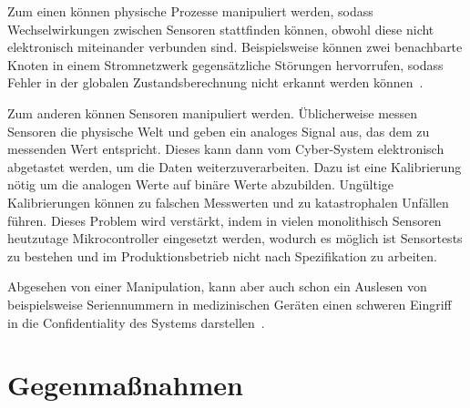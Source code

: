 \documentclass[final,bibliography=totocnumbered]{include/sikseminar}
\newcommand{\cps}{\glspl{cps}\xspace}
\begin{document}
    Zum einen können physische Prozesse manipuliert werden, sodass Wechselwirkungen zwischen Sensoren stattfinden können, obwohl diese nicht elektronisch miteinander verbunden sind.
    Beispielsweise können zwei benachbarte Knoten in einem Stromnetzwerk gegensätzliche Störungen hervorrufen, sodass Fehler in der globalen Zustandsberechnung nicht erkannt werden können~\cite{KLG15}.

    Zum anderen können Sensoren manipuliert werden.
    Üblicherweise messen Sensoren die physische Welt und geben ein analoges Signal aus, das dem zu messenden Wert entspricht.
    Dieses kann dann vom Cyber-System elektronisch abgetastet werden, um die Daten weiterzuverarbeiten.
    Dazu ist eine Kalibrierung nötig um die analogen Werte auf binäre Werte abzubilden.
    Ungültige Kalibrierungen können zu falschen Messwerten und zu katastrophalen Unfällen führen.
    Dieses Problem wird verstärkt, indem in vielen monolithisch Sensoren heutzutage Mikrocontroller eingesetzt werden, wodurch es möglich ist Sensortests zu bestehen und im Produktionsbetrieb nicht nach Spezifikation zu arbeiten.~\cite{KLG15}

    Abgesehen von einer Manipulation, kann aber auch schon ein Auslesen von beispielsweise Seriennummern in medizinischen Geräten einen schweren Eingriff in die Confidentiality des Systems darstellen~\cite{HLL+17}.



    \section{Gegenmaßnahmen}\label{sec:gegenmassnahmen}
\end{document}
